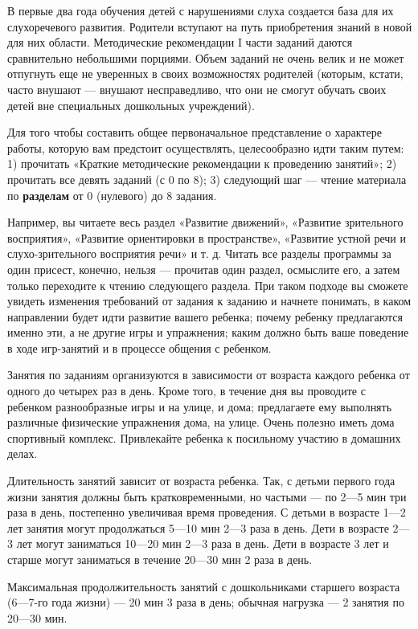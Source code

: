 \documentclass[a5paper]{book}
\begin{document}
В первые два года обучения детей с нарушениями слуха создается база для
их слухоречевого развития. Родители вступают на путь приобретения знаний
в новой для них области. Методические рекомендации I части заданий
даются сравнительно небольшими порциями. Объем заданий не очень велик и
не может отпугнуть еще не уверенных в своих возможностях родителей
(которым, кстати, часто внушают --- внушают несправедливо, что они не
смогут обучать своих детей вне специальных дошкольных учреждений).

Для того чтобы составить общее первоначальное представление о характере
работы, которую вам предстоит осуществлять, целесообразно идти таким
путем: 1) прочитать «Краткие методические рекомендации к проведению
занятий»; 2) прочитать все девять заданий (с 0 по 8); 3) следующий шаг
--- чтение материала по \textbf{разделам} от 0 (нулевого) до 8 задания.

Например, вы читаете весь раздел «Развитие движений», «Развитие
зрительного восприятия», «Развитие ориентировки в пространстве»,
«Развитие устной речи и слухо-зрительного восприятия речи» и т. д.
Читать все разделы программы за один присест, конечно, нельзя ---
прочитав один раздел, осмыслите его, а затем только переходите к чтению
следующего раздела. При таком подходе вы сможете увидеть изменения
требований от задания к заданию и начнете понимать, в каком направлении
будет идти развитие вашего ребенка; почему ребенку предлагаются именно
эти, а не другие игры и упражнения; каким должно быть ваше поведение в
ходе игр-занятий и в процессе общения с ребенком.

Занятия по заданиям организуются в зависимости от возраста каждого
ребенка от одного до четырех раз в день. Кроме того, в течение дня вы
проводите с ребенком разнообразные игры и на улице, и дома; предлагаете
ему выполнять различные физические упражнения дома, на улице. Очень
полезно иметь дома спортивный комплекс. Привлекайте ребенка к посильному
участию в домашних делах.

Длительность занятий зависит от возраста ребенка. Так, с детьми первого
года жизни занятия должны быть кратковременными, но частыми --- по 2---5
мин три раза в день, постепенно увеличивая время проведения. С детьми в
возрасте 1---2 лет занятия могут продолжаться 5---10 мин 2---3 раза в
день. Дети в возрасте 2---3 лет могут заниматься 10---20 мин 2---3 раза
в день. Дети в возрасте 3 лет и старше могут заниматься в течение
20---30 мин 2 раза в день.

Максимальная продолжительность занятий с дошкольниками старшего возраста
(6---7-го года жизни) --- 20 мин 3 раза в день; обычная нагрузка --- 2
занятия по 20---30 мин.
\end{document}

